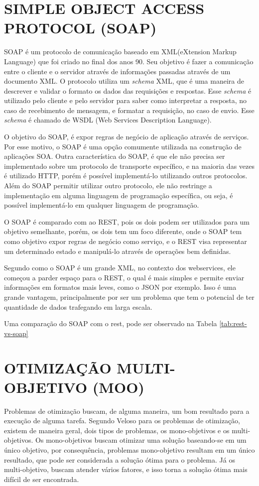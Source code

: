 

\section{SIMPLE OBJECT ACCESS PROTOCOL (SOAP)}
SOAP é um protocolo de comunicação baseado em XML(eXtension Markup Language) que foi criado no final 
dos anos 90. Seu objetivo é fazer a comunicação entre o cliente e o servidor através de informações 
passadas através de um documento XML. O protocolo utiliza um \textit{schema} XML, que é uma 
maneira de descrever e validar o formato os dados das requisições e respostas. 
Esse \textit{schema} é utilizado pelo cliente e pelo servidor para saber como interpretar 
a resposta, no caso de recebimento de mensagem, e formatar a requisição, no caso de envio.
Esse \textit{schema} é chamado de WSDL (Web Services Description Language).

O objetivo do SOAP, é expor regras de negócio de aplicação através de serviços. 
Por esse motivo, o SOAP é uma opção comumente utilizada na construção de aplicações SOA. 
Outra característica do SOAP, é que ele não precisa ser implementado sobre um protocolo de 
transporte específico, e na maioria das vezes é utilizado HTTP, porém é possível implementá-lo
utilizando outros protocolos. Além do SOAP permitir utilizar outro protocolo, 
ele não restringe a implementação em alguma linguagem de programação específica, ou seja,
é possível implementá-lo em qualquer linguagem de programação.

O SOAP é comparado com ao REST, pois os dois podem ser utilizados para um objetivo 
semelhante, porém, os dois tem um foco diferente, onde o SOAP tem como objetivo expor regras de negócio 
como serviço, e o REST visa representar um determinado estado e manipulá-lo através de operações 
bem definidas.

Segundo \cite{lecheta} como o SOAP é um grande XML, no contexto dos webservices, ele começou
a parder espaço para o REST, o qual é mais simples 
e permite enviar informações em formatos mais leves, como o JSON por exemplo. 
Isso é uma grande vantagem, principalmente por ser um problema
que tem o potencial de ter quantidade de dados trafegando em larga escala.

Uma comparação do SOAP com o rest, pode ser observado na Tabela \ref{tab:rest-vs-soap}



\section{OTIMIZAÇÃO MULTI-OBJETIVO (MOO)}  
Problemas de otimização buscam, de alguma maneira, um bom resultado para a execução de alguma tarefa.
Segundo Veloso \cite{veloso} para os problemas de otimização, existem de maneira geral, 
dois tipos de problemas, os mono-objetivos e os multi-objetivos. 
Os mono-objetivos buscam otimizar uma solução baseando-se em um único objetivo, por consequência, 
problemas mono-objetivo resultam em um único resultado, que pode ser considerada a solução ótima para o 
problema. Já os multi-objetivo, buscam atender vários fatores, e isso torna a solução ótima mais 
difícil de ser encontrada.

